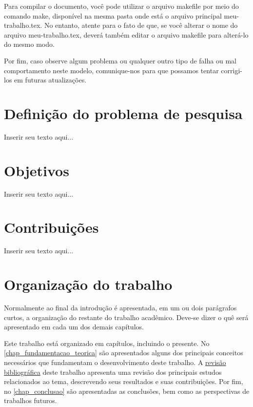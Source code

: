 Para compilar o documento, você pode utilizar o arquivo {\color{red} makefile} por meio do comando {\color{red} make}, disponível na mesma pasta onde está o arquivo principal {\color{red} meu-\allowbreak trabalho.tex}.
No entanto, atente para o fato de que, se você alterar o nome do arquivo {\color{red} meu-\allowbreak trabalho.tex}, deverá também editar o arquivo {\color{red} makefile} para alterá-lo do mesmo modo.

Por fim, caso observe algum problema ou qualquer outro tipo de falha ou mal comportamento neste modelo, comunique-nos para que possamos tentar corrigi-los em futuras atualizações.

\section{Definição do problema de pesquisa}
\label{sec_definicao_problema_pesquisa}

Inserir seu texto aqui...

\section{Objetivos}
\label{sec_objetivos}

Inserir seu texto aqui...

\section{Contribuições}
\label{sec_contribuicoes}

Inserir seu texto aqui...

\section{Organização do trabalho}
\label{sec_organizacao_trabalho}

Normalmente ao final da introdução é apresentada, em um ou dois parágrafos curtos, a organização do restante do trabalho acadêmico.
Deve-se dizer o quê será apresentado em cada um dos demais capítulos.

Este trabalho está organizado em capítulos, incluindo o presente.
No \autoref{chap_fundamentacao_teorica} são apresentados alguns dos principais conceitos necessários que fundamentam o desenvolvimento deste trabalho.
A \hyperref[chap_trabalhos_relacionados]{revisão bibliográfica} deste trabalho apresenta uma revisão dos principais estudos relacionados ao tema, descrevendo seus resultados e suas contribuições.
Por fim, no \autoref{chap_conclusao} são apresentadas as conclusões, bem como as perspectivas de trabalhos futuros.
